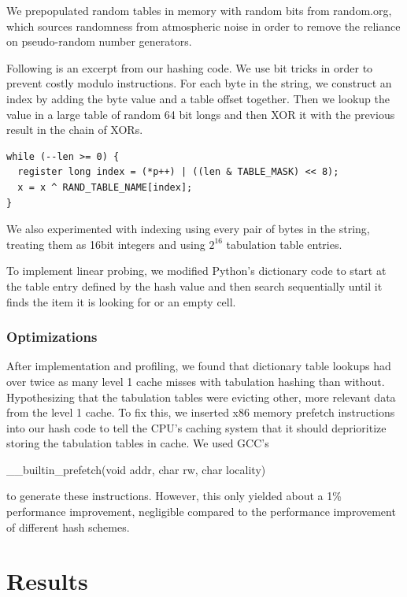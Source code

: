 \documentclass[runningheads,a4paper]{llncs}
\begin{document}
We prepopulated random tables in memory with random bits from random.org, which
sources randomness from atmospheric noise in order to remove the reliance on
pseudo-random number generators.
      

Following is an excerpt from our hashing code.  We use bit tricks in
order to prevent costly modulo instructions.  For each byte in the
string, we construct an index by adding the byte value and a table offset
together.  Then we lookup the value in a large table of random 64 bit
longs and then XOR it with the previous result in the chain of XORs.

\begin{verbatim}
while (--len >= 0) {
  register long index = (*p++) | ((len & TABLE_MASK) << 8);
  x = x ^ RAND_TABLE_NAME[index];
}
\end{verbatim}

We also experimented with indexing using every pair of bytes in the string,
treating them as 16bit integers and
using $2^{16}$ tabulation table entries.

To implement linear probing, we modified Python's dictionary code to start at
the table entry defined by the hash value and then search sequentially until it
finds the item it is looking for or an empty cell.

\subsubsection{Optimizations}

After implementation and profiling, we found that dictionary table lookups had
over twice as many level 1 cache misses with tabulation hashing than without.
Hypothesizing that the tabulation tables were evicting other, more relevant
data from the level 1 cache.  To fix this, we inserted x86 memory prefetch
instructions into our hash code to tell the CPU's caching system that it should
deprioritize storing the tabulation tables in cache.  We used GCC's
\begin{tt}\_\_builtin\_prefetch(void \*addr, char rw, char locality)\end{tt} \cite{prefetch}
to generate these instructions.  However, this only yielded about a 1\% performance improvement,
negligible compared to the performance improvement of different hash schemes.

\section{Results}
\end{document}
